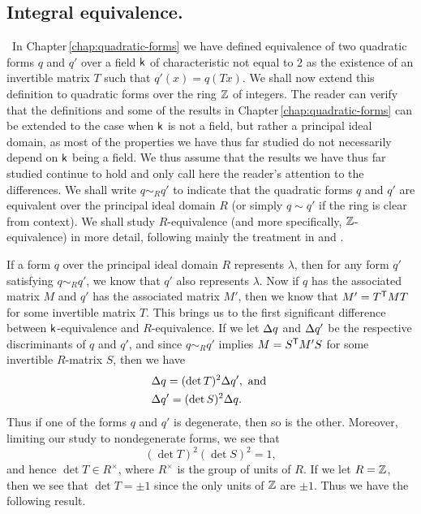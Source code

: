 \subsection{Integral equivalence.}~In Chapter\,\ref{chap:quadratic-forms} we have defined equivalence of two quadratic forms \(q\) and \(q'\) over a field \(\mathsf{k}\) of characteristic not equal to \(2\) as the existence of an invertible matrix \(T\) such that \(q'(x) = q(Tx)\). We shall now extend this definition to quadratic forms over the ring \(\mathbb{Z}\) of integers. The reader can verify that the definitions and some of the results in Chapter\,\ref{chap:quadratic-forms}  can be extended to the case when \(\mathsf{k}\) is not a field, but rather a principal ideal domain, as most of the properties we have thus far studied do not necessarily depend on \(\mathsf{k}\) being a field. We thus assume that the results we have thus far studied continue to hold and only call here the reader's attention to the differences. We shall write \(q \sim_{R} q'\) to indicate that the quadratic forms \(q\) and \(q'\) are equivalent over the principal ideal domain \(R\) (or simply \(q \sim q'\) if the ring is clear from context). We shall study \(R\)-equivalence (and more specifically, \(\mathbb{Z}\)-equivalence) in more detail, following mainly the treatment in \cite{cassels2008rational} and \cite{jones1950arithmetic}.

If a form \(q\) over the principal ideal domain \(R\) represents \(\lambda\), then for any form \(q'\) satisfying \(q \sim_{R} q'\), we know that \(q'\) also represents \(\lambda\). Now if \(q\) has the associated matrix \(M\) and \(q'\) has the associated matrix \(M'\), then we know that \(M' = T^{\mathsf{T}} M T\) for some invertible matrix \(T\). This brings us to the first significant difference between \(\mathsf{k}\)-equivalence and \(R\)-equivalence. If we let \({\Delta} q\) and \({\Delta} q'\) be the respective discriminants of \(q\) and \(q'\), and since \(q \sim_{R} q'\) implies \(M = S^{\mathsf{T}} M' S\) for some invertible \(R\)-matrix \(S\), then we have
\begin{align*}
    &{\Delta} q = (\det T)^2 {\Delta} q',\text{ and }\\
    &{\Delta} q' = (\det S)^2 {\Delta} q.
\end{align*}
Thus if one of the forms \(q\) and \(q'\) is degenerate, then so is the other. Moreover, limiting our study to nondegenerate forms, we see that
\[
  (\det T)^2 (\det S)^2 = 1,
\]
and hence \(\det T \in R^{\times}\), where \(R^{\times}\) is the group of units of \(R\). If we let \(R = \mathbb{Z}\), then we see that \(\det T = \pm 1\) since the only units of \(\mathbb{Z}\) are \(\pm 1\). Thus we have the following result.

